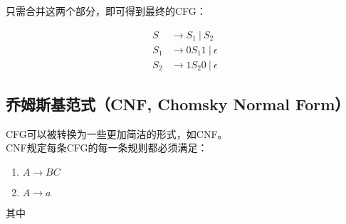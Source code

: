只需合并这两个部分，即可得到最终的CFG：

\vspace{-1cm}

\begin{align*}
    S   & \rightarrow S_1\ |\ S_2          \\
    S_1 & \rightarrow 0S_{1}1\ |\ \epsilon \\
    S_2 & \rightarrow 1S_{2}0\ |\ \epsilon
\end{align*}

\vspace{0.5cm}

\subsection{乔姆斯基范式（CNF, Chomsky Normal Form）}

CFG可以被转换为一些更加简洁的形式，如CNF。\\

CNF规定每条CFG的每一条规则都必须满足：

\begin{enumerate}
    \item $ A \rightarrow BC $
    \item $ A \rightarrow a $
\end{enumerate}

其中

\newpage